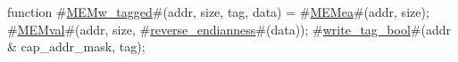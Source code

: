 function #\hyperref[sailMIPSzMEMwzytagged]{MEMw\_tagged}#(addr, size, tag, data) =
{
  #\hyperref[sailMIPSzMEMea]{MEMea}#(addr, size);
  #\hyperref[sailMIPSzMEMval]{MEMval}#(addr, size, #\hyperref[sailMIPSzreversezyendianness]{reverse\_endianness}#(data));
  #\hyperref[sailMIPSzwritezytagzybool]{write\_tag\_bool}#(addr & cap_addr_mask, tag);
}
